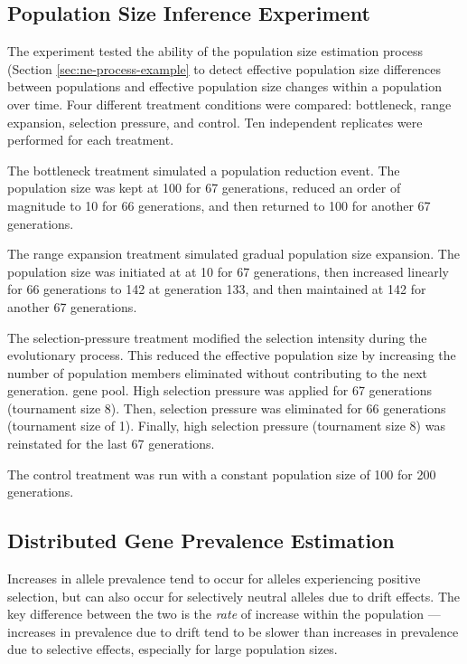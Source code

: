\subsection{Population Size Inference Experiment}
\label{sec:population-size-inference-experiments}

The experiment tested the ability of the population size estimation process (Section \ref{sec:ne-process-example} to detect effective population size differences between populations and effective population size changes within a population over time.
Four different treatment conditions were compared: bottleneck, range expansion, selection pressure, and control.
Ten independent replicates were performed for each treatment.

The bottleneck treatment simulated a population reduction event.
The population size was kept at 100 for 67 generations, reduced an order of magnitude to 10 for 66 generations, and then returned to 100 for another 67 generations.

The range expansion treatment simulated gradual population size expansion.
The population size was initiated at at 10 for 67 generations, then increased linearly for 66 generations to 142 at generation 133, and then maintained at 142 for another 67 generations.

The selection-pressure treatment modified the selection intensity during the evolutionary process.
This reduced the effective population size by increasing the number of population members eliminated without contributing to the next generation. gene pool.
High selection pressure was applied for 67 generations (tournament size 8). Then, selection pressure was eliminated for 66 generations (tournament size of 1).
Finally, high selection pressure (tournament size 8) was reinstated for the last 67 generations.

The control treatment was run with a constant population size of 100 for 200 generations.

\subsection{Distributed Gene Prevalence Estimation}
\label{sec:dist-gene-prevalence-est}

Increases in allele prevalence tend to occur for alleles experiencing positive selection, but can also occur for selectively neutral alleles due to drift effects.
The key difference between the two is the \textit{rate} of increase within the population --- increases in prevalence due to drift tend to be slower than increases in prevalence due to selective effects, especially for large population sizes.

